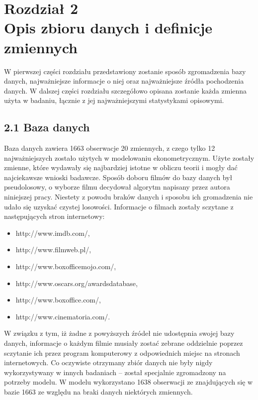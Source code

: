 \newpage
\chapter*{Rozdział 2 \\ \vspace{1cm} Opis zbioru danych i definicje zmiennych}
 
W pierwszej części rozdziału przedstawiony zostanie sposób zgromadzenia bazy danych, najważniejsze informacje o niej oraz najważniejsze źródła pochodzenia danych. W dalszej części rozdziału szczegółowo opisana zostanie każda zmienna użyta w badaniu, łącznie z jej najważniejszymi statystykami opisowymi. 

\section*{2.1 Baza danych}

Baza danych zawiera 1663 obserwacje 20 zmiennych, z czego tylko 12 najważniejszych zostało użytych w modelowaniu ekonometrycznym. Użyte zostały zmienne, które wydawały się najbardziej istotne w obliczu teorii i mogły dać najciekawsze wnioski badawcze. Sposób doboru filmów do bazy danych był pseudolosowy, o wyborze filmu decydował algorytm napisany przez autora niniejszej pracy. Niestety z powodu braków danych i sposobu ich gromadzenia nie udało się uzyskać czystej losowości. Informacje o filmach zostały sczytane z następujących stron internetowy:

\begin{itemize}
\item http://www.imdb.com/,
\item http://www.filmweb.pl/,
\item http://www.boxofficemojo.com/,
\item http://www.oscars.org/awardsdatabase,
\item http://www.boxoffice.com/,
\item http://www.cinematoria.com/.
\end{itemize}

W związku z tym, iż żadne z powyższych źródeł nie udostępnia swojej bazy danych, informacje o każdym filmie musiały zostać zebrane oddzielnie poprzez sczytanie ich przez program komputerowy z odpowiednich miejsc na stronach internetowych. Co oczywiste otrzymany zbiór danych nie były nigdy wykorzystywany w innych badaniach – został specjalnie zgromadzony na potrzeby modelu. W modelu wykorzystano 1638 obserwacji ze znajdujących się w bazie 1663 ze względu na braki danych niektórych zmiennych.

